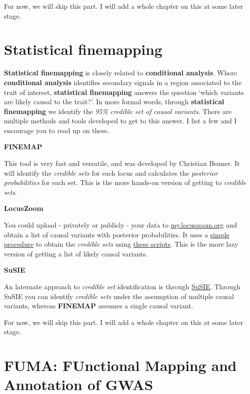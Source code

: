 \documentclass[
]{book}
\begin{document}
For now, we will skip this part. I will add a whole chapter on this at some later stage.

\hypertarget{statistical-finemapping}{%
\section{Statistical finemapping}\label{statistical-finemapping}}

\textbf{Statistical finemapping} is closely related to \textbf{conditional analysis}. Where \textbf{conditional analysis} identifies secondary signals in a region associated to the trait of interest, \textbf{statistical finemapping} answers the question `which variants are likely causal to the trait?'. In more formal words, through \textbf{statistical finemapping} we identify the \emph{95\% credible set of causal variants}.
There are multiple methods and tools developed to get to this answer. I list a few and I encourage you to read up on these.

\textbf{FINEMAP}

This tool is very fast and versatile, and was developed by Christian Benner. It will identify the \emph{credible sets} for each locus and calculates the \emph{posterior probabilities} for each set. This is the more hands-on version of getting to \emph{credible sets}.

\textbf{LocusZoom}

You could upload - privately or publicly - your data to \href{https://my.locuszoom.org}{my.locuszoom.org} and obtain a list of causal variants with posterior probabilities. It uses a \href{https://statgen.github.io/gwas-credible-sets/method/locuszoom-credible-sets.pdf}{simple procedure} to obtain the \emph{credible sets} using \href{https://github.com/statgen/gwas-credible-sets/}{these scripts}. This is the more lazy version of getting a list of likely causal variants.

\textbf{SuSIE}

An laternate approach to \emph{credible set} identification is through \href{https://stephenslab.github.io/susieR/index.html}{SuSIE}. Through SuSIE you can identify \emph{credible sets} under the assumption of multiple causal variants, whereas \textbf{FINEMAP} assumes a single causal variant.

For now, we will skip this part. I will add a whole chapter on this at some later stage.

\hypertarget{fuma-functional-mapping-and-annotation-of-gwas}{%
\section{FUMA: FUnctional Mapping and Annotation of GWAS}\label{fuma-functional-mapping-and-annotation-of-gwas}}
\end{document}
